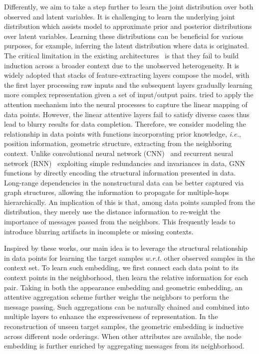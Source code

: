 \documentclass[sigconf]{acmart} %
\newcommand{\ie}{\textit{i.e.}}
\newcommand{\qy}[1]{\textcolor{blue}{#1}}
\begin{document}
Differently, we aim to take a step further to learn the joint distribution over both observed and latent variables. It is challenging to learn the underlying joint distribution which assists model to approximate prior and posterior distributions over latent variables. Learning these distributions can be beneficial for various purposes, for example, inferring the latent distribution where data is originated. 
The critical limitation in the existing architectures~\cite{ye2015stochastic,garnelo2018neural,kim2019attentive} is that they fail to build induction across a broader context due to the unobserved heterogeneity. It is widely adopted that stacks of feature‐extracting layers compose the model, with the first layer processing raw inputs and the subsequent layers gradually learning more complex representation given a set of input/output pairs. \cite{kim2019attentive} tried to apply the attention mechanism into the neural processes to capture the linear mapping of data points. However, the linear attentive layers fail to satisfy diverse cases thus lead to blurry results for data completion.
Therefore, we consider modeling the relationship in data points with functions incorporating prior knowledge, \ie, position information, geometric structure, extracting from the neighboring context. 
Unlike convolutional neural network (CNN)~\cite{lecun1989backpropagation,krizhevsky2012imagenet} and recurrent neural network (RNN)~\cite{hochreiter1997long,elman1990finding} exploiting simple redundancies and invariances in data, GNN functions by directly encoding the structural information presented in data.
Long-range dependencies in the nonstructural data can be better captured via graph structures, allowing the information to propagate for multiple-hops hierarchically. 
An implication of this is that, among data points sampled from the distribution, they merely use the distance information to re-weight the importance of messages passed from the neighbors. This frequently leads to introduce blurring artifacts in incomplete or missing contexts.

Inspired by these works, our main idea is to leverage the structural relationship in data points for learning the target samples \textit{w.r.t.} other observed samples in the context set. To learn such embedding, we first connect each data point to its context points in the neighborhood, then learn the relative information for each pair. Taking in both the appearance embedding and geometric embedding, an attentive aggregation scheme further weighs the neighbors to perform the message passing. Such aggregations can be naturally chained and combined into multiple layers to enhance the expressiveness of representation. In the reconstruction of unseen target samples, the geometric embedding is inductive across different node orderings. When other attributes are available, the node embedding is further enriched by aggregating messages from its neighborhood. 
\end{document}
